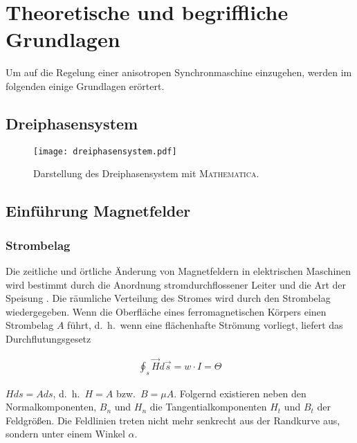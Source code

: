 
\chapter{Theoretische und begriffliche Grundlagen}\label{cha:grundlagen}

Um auf die Regelung einer anisotropen Synchronmaschine einzugehen, werden im folgenden einige Grundlagen erörtert.

\section{Dreiphasensystem}\label{sec:dreiphasensystem}

\begin{figure}[h]
\centering
\texttt{[image: dreiphasensystem.pdf]}
\label{fig:dreiphasensystem}
\caption{Darstellung des Dreiphasensystem mit \textsc{Mathematica}.}
\end{figure}

\section{Einführung Magnetfelder}\label{sec:magnetfelder}

\subsection{Strombelag}\label{sec:strombelag}

Die zeitliche und örtliche Änderung von Magnetfeldern in elektrischen Maschinen wird bestimmt durch die Anordnung stromdurchflossener Leiter und die Art der Speisung \parencite[S.~199]{hofmann2013}.
Die räumliche Verteilung des Stromes wird durch den Strombelag wiedergegeben.
Wenn die Oberfläche eines ferromagnetischen Körpers einen Strombelag $A$ führt, d.\ h.\ wenn eine flächenhafte Strömung vorliegt, liefert das Durchflutungsgesetz

\begin{align}
\oint_{s}{\vec{H}d\vec{s}} = w\cdot I = \Theta \label{durchflutungsgesetz}
\end{align}

$Hds=Ads$, d.\ h.\ $H = A$ bzw.\ $B = \mu A$.
Folgernd existieren neben den Normalkomponenten, $B_n$ und $H_n$ die Tangentialkomponenten $H_t$ und $B_t$ der Feldgrößen.
Die Feldlinien treten nicht mehr senkrecht aus der Randkurve aus, sondern unter einem Winkel $\alpha$.

